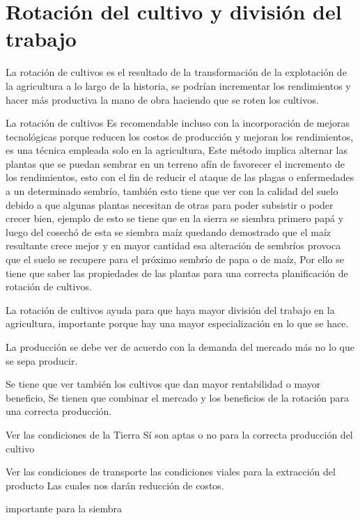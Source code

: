 \documentclass[
  letterpaper,
  DIV=11,
  numbers=noendperiod]{scrartcl}
\begin{document}
\hypertarget{rotaciuxf3n-del-cultivo-y-divisiuxf3n-del-trabajo}{%
\section{Rotación del cultivo y división del
trabajo}\label{rotaciuxf3n-del-cultivo-y-divisiuxf3n-del-trabajo}}

La rotación de cultivos es el resultado de la transformación de la
explotación de la agricultura a lo largo de la historia, se podrían
incrementar los rendimientos y hacer más productiva la mano de obra
haciendo que se roten los cultivos.

La rotación de cultivos Es recomendable incluso con la incorporación de
mejoras tecnológicas porque reducen los costos de producción y mejoran
los rendimientos, es una técnica empleada solo en la agricultura, Este
método implica alternar las plantas que se puedan sembrar en un terreno
afín de favorecer el incremento de los rendimientos, esto con el fin de
reducir el ataque de las plagas o enfermedades a un determinado sembrío,
también esto tiene que ver con la calidad del suelo debido a que algunas
plantas necesitan de otras para poder subsistir o poder crecer bien,
ejemplo de esto se tiene que en la sierra se siembra primero papá y
luego del cosechó de esta se siembra maíz quedando demostrado que el
maíz resultante crece mejor y en mayor cantidad esa alteración de
sembríos provoca que el suelo se recupere para el próximo sembrío de
papa o de maíz, Por ello se tiene que saber las propiedades de las
plantas para una correcta planificación de rotación de cultivos.

La rotación de cultivos ayuda para que haya mayor división del trabajo
en la agricultura, importante porque hay una mayor especialización en lo
que se hace.

La producción se debe ver de acuerdo con la demanda del mercado más no
lo que se sepa producir.

Se tiene que ver también los cultivos que dan mayor rentabilidad o mayor
beneficio, Se tienen que combinar el mercado y los beneficios de la
rotación para una correcta producción.

Ver las condiciones de la Tierra Sí son aptas o no para la correcta
producción del cultivo

Ver las condiciones de transporte las condiciones viales para la
extracción del producto Las cuales nos darán reducción de costos.

importante para la siembra
\end{document}
